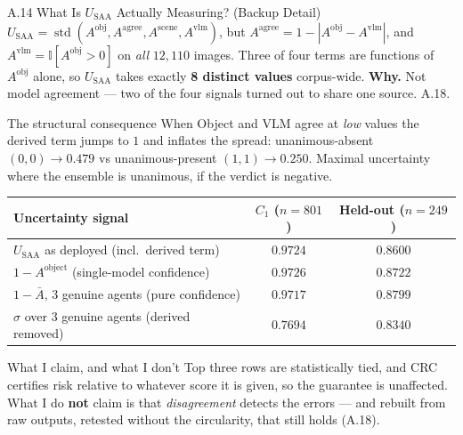 \documentclass[aspectratio=169,11pt]{beamer}
\begin{document}
\begin{frame}{A.14 What Is $U_{\text{SAA}}$ Actually Measuring? (Backup Detail)}
\footnotesize
\scriptsize $U_{\text{SAA}}=\operatorname{std}(A^{\text{obj}}, A^{\text{agree}}, A^{\text{scene}}, A^{\text{vlm}})$, but $A^{\text{agree}}=1-|A^{\text{obj}}-A^{\text{vlm}}|$, and $A^{\text{vlm}}=\mathbb{I}[A^{\text{obj}}>0]$ on \emph{all} $12{,}110$ images. Three of four terms are functions of $A^{\text{obj}}$ alone, so $U_{\text{SAA}}$ takes exactly \textbf{8 distinct values} corpus-wide.
\vskip 2pt
\scriptsize \textbf{Why.} Not model agreement --- two of the four signals turned out to share one source. A.18.

\vspace{-3.5mm}
\begin{block}{\scriptsize The structural consequence}
\tiny When Object and VLM agree at \emph{low} values the derived term jumps to $1$ and inflates the spread: unanimous-absent $(0,0)\rightarrow\mathbf{0.479}$ vs unanimous-present $(1,1)\rightarrow 0.250$. Maximal uncertainty where the ensemble is unanimous, if the verdict is negative.
\end{block}

\vspace{-3mm}
\begin{center}\scriptsize
\begin{tabular}{lcc}
\toprule
\textbf{Uncertainty signal} & \textbf{$C_1$ ($n{=}801$)} & \textbf{Held-out ($n{=}249$)} \\
\midrule
$U_{\text{SAA}}$ as deployed (incl.\ derived term) & $\mathbf{0.9724}$ & $\mathbf{0.8600}$ \\
$1 - A^{\text{object}}$ (single-model confidence) & $0.9726$ & $0.8722$ \\
$1 - \bar{A}$, 3 genuine agents (pure confidence) & $0.9717$ & $0.8799$ \\
$\sigma$ over 3 genuine agents (derived removed) & $0.7694$ & $0.8340$ \\
\bottomrule
\end{tabular}
\end{center}

\vspace{-3mm}

\begin{alertblock}{\scriptsize What I claim, and what I don't}
\tiny Top three rows are statistically tied, and CRC certifies risk relative to whatever score it is given, so the guarantee is unaffected. What I do \textbf{not} claim is that \emph{disagreement} detects the errors --- and rebuilt from raw outputs, retested without the circularity, that still holds (A.18).
\end{alertblock}
\end{frame}
\end{document}
